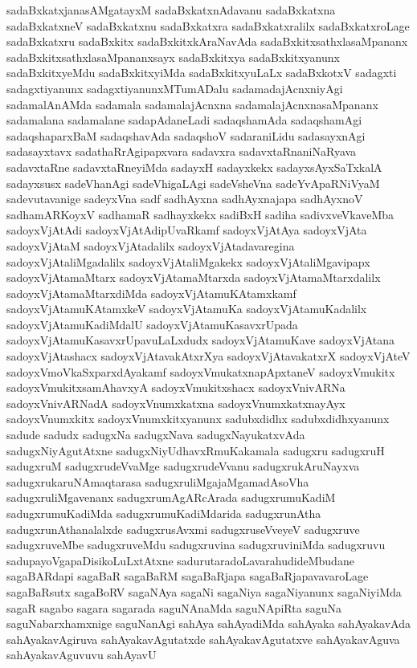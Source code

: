 {sadaBxkatxjanasAMgatayxM
sadaBxkatxnAdavanu
sadaBxkatxna
sadaBxkatxneV
sadaBxkatxnu
sadaBxkatxra
sadaBxkatxralilx
sadaBxkatxroLage
sadaBxkatxru
sadaBxkitx
sadaBxkitxkAraNavAda
sadaBxkitxsathxlasaMpananx
sadaBxkitxsathxlasaMpananxsayx
sadaBxkitxya
sadaBxkitxyanunx
sadaBxkitxyeMdu
sadaBxkitxyiMda
sadaBxkitxyuLaLx
sadaBxkotxV
sadagxti
sadagxtiyanunx
sadagxtiyanunxMTumADalu
sadamadajAcnxniyAgi
sadamalAnAMda
sadamala
sadamalajAcnxna
sadamalajAcnxnasaMpananx
sadamalana
sadamalane
sadapAdaneLadi
sadaqshamAda
sadaqshamAgi
sadaqshaparxBaM
sadaqshavAda
sadaqshoV
sadaraniLidu
sadasayxnAgi
sadasayxtavx
sadathaRrAgipapxvara
sadavxra
sadavxtaRnaniNaRyava
sadavxtaRne
sadavxtaRneyiMda
sadayxH
sadayxkekx
sadayxsAyxSaTxkalA
sadayxsusx
sadeVhanAgi
sadeVhigaLAgi
sadeVsheVna
sadeYvApaRNiVyaM
sadevutavanige
sadeyxVna
sadf
sadhAyxna
sadhAyxnajapa
sadhAyxnoV
sadhamARKoyxV
sadhamaR
sadhayxkekx
sadiBxH
sadiha
sadivxveVkaveMba
sadoyxVjAtAdi
sadoyxVjAtAdipUvaRkamf
sadoyxVjAtAya
sadoyxVjAta
sadoyxVjAtaM
sadoyxVjAtadalilx
sadoyxVjAtadavaregina
sadoyxVjAtaliMgadalilx
sadoyxVjAtaliMgakekx
sadoyxVjAtaliMgavipapx
sadoyxVjAtamaMtarx
sadoyxVjAtamaMtarxda
sadoyxVjAtamaMtarxdalilx
sadoyxVjAtamaMtarxdiMda
sadoyxVjAtamuKAtamxkamf
sadoyxVjAtamuKAtamxkeV
sadoyxVjAtamuKa
sadoyxVjAtamuKadalilx
sadoyxVjAtamuKadiMdalU
sadoyxVjAtamuKasavxrUpada
sadoyxVjAtamuKasavxrUpavuLaLxdudx
sadoyxVjAtamuKave
sadoyxVjAtana
sadoyxVjAtashacx
sadoyxVjAtavakAtxrXya
sadoyxVjAtavakatxrX
sadoyxVjAteV
sadoyxVmoVkaSxparxdAyakamf
sadoyxVmukatxnapApxtaneV
sadoyxVmukitx
sadoyxVmukitxsamAhavxyA
sadoyxVmukitxshacx
sadoyxVnivARNa
sadoyxVnivARNadA
sadoyxVnumxkatxna
sadoyxVnumxkatxnayAyx
sadoyxVnumxkitx
sadoyxVnumxkitxyanunx
sadubxdidhx
sadubxdidhxyanunx
sadude
sadudx
sadugxNa
sadugxNava
sadugxNayukatxvAda
sadugxNiyAgutAtxne
sadugxNiyUdhavxRmuKakamala
sadugxru
sadugxruH
sadugxruM
sadugxrudeVvaMge
sadugxrudeVvanu
sadugxrukAruNayxva
sadugxrukaruNAmaqtarasa
sadugxruliMgajaMgamadAsoVha
sadugxruliMgavenanx
sadugxrumAgARcArada
sadugxrumuKadiM
sadugxrumuKadiMda
sadugxrumuKadiMdarida
sadugxrunAtha
sadugxrunAthanalalxde
sadugxrusAvxmi
sadugxruseVveyeV
sadugxruve
sadugxruveMbe
sadugxruveMdu
sadugxruvina
sadugxruviniMda
sadugxruvu
sadupayoVgapaDisikoLuLxtAtxne
sadurutaradoLavarahudideMbudane
sagaBARdapi
sagaBaR
sagaBaRM
sagaBaRjapa
sagaBaRjapavavaroLage
sagaBaRsutx
sagaBoRV
sagaNAya
sagaNi
sagaNiya
sagaNiyanunx
sagaNiyiMda
sagaR
sagabo
sagara
sagarada
saguNAnaMda
saguNApiRta
saguNa
saguNabarxhamxnige
saguNanAgi
sahAya
sahAyadiMda
sahAyaka
sahAyakavAda
sahAyakavAgiruva
sahAyakavAgutatxde
sahAyakavAgutatxve
sahAyakavAguva
sahAyakavAguvuvu
sahAyavU
}
